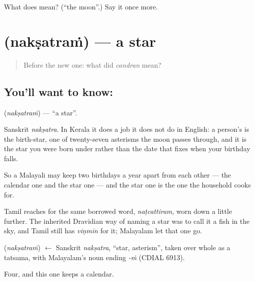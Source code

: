\begin{tcolorbox}[breakable,colback=teal!4,colframe=teal!35!black,title={Before you move on}]
What does  mean? (\textquotedblleft{}the moon\textquotedblright{}.) Say it once more.
\end{tcolorbox}
\section[\texorpdfstring{\ml{നക്ഷത്രം} (nakṣatraṁ)}{നക്ഷത്രം (nakṣatraṁ)}]{ (nakṣatraṁ) — a star}

\label{lesson:ML-C53-star}



\begin{quote}
Before the new one: what did \emph{candran} mean?
\end{quote}

\subsection*{You'll want to know: }
\textbf{} (\emph{nakṣatraṁ}) — \textquotedblleft{}a star\textquotedblright{}.

Sanskrit \emph{nakṣatra}. In Kerala it does a job it does not do in English: a person's  is the birth-star, one of twenty-seven asterisms the moon passes through, and it is the star you were born under rather than the date that fixes when your birthday falls.

So a Malayali may keep two birthdays a year apart from each other — the calendar one and the star one — and the star one is the one the household cooks for.

Tamil reaches for the same borrowed word, \emph{naṭcattiram}, worn down a little further. The inherited Dravidian way of naming a star was to call it a fish in the sky, and Tamil still has \emph{viṇmīn} for it; Malayalam let that one go.

\begin{cousinweb}
\textbf{} (\emph{nakṣatraṁ}) $\leftarrow$ Sanskrit \emph{nakṣatra}, \textquotedblleft{}star, asterism\textquotedblright{}, taken over whole as a tatsama, with Malayalam's noun ending \emph{-ṁ} (CDIAL 6913).
\end{cousinweb}

\begin{grammarlens}[title={What you've built}]
Four, and this one keeps a calendar.
\end{grammarlens}

